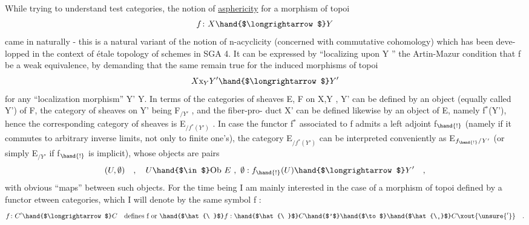 While trying to understand test categories, the notion of \uline{asphericity}
for a morphism of topoi
\[ f\colon X \hand{$\longrightarrow$} Y \]
came in naturally - this is a natural  variant of the notion of
n-acyclicity (concerned with commutative cohomology) which has been deve-%
lopped in the context of étale topology of schemes in SGA 4. It can be
expressed by ``localizing upon Y '' the Artin-Mazur condition that f be
a weak equivalence, by demanding that the same remain true for the induced
morphisms of topoi
\[ X\mathrm{x}_{Y}Y' \hand{$\longrightarrow$} Y' \]
for any ``localization morphism'' Y'\hand{$\longrightarrow$} Y. In terms of the categories of
sheaves  E, F on X,Y , Y' can be defined by an object (equally called
Y') of F, the category of sheaves on Y' being F$_{/Y'}$ , and the fiber-pro-%
duct X' can be defined likewise by an object  of E, namely  f$^{*}$(Y'),
hence the corresponding category of sheaves is E$_{/f^{*}(Y')}$ . In case the
functor f$^{*}$ associated to f admits a left adjoint f$_{\hand{!}}$ (namely if it commutes
to arbitrary inverse limits, not only to finite one's), the category
E$_{/f^{*}(Y')}$ can be interpreted conveniently as  E$_{f_{\hand{!}}/Y'}$ (or simply E$_{/Y'}$
if f$_{\hand{!}}$ is implicit), whose objects are pairs
\[ (U,\emptyset) \quad , \quad U \hand{$\in$} \mathrm{Ob}\ E \ , \ \emptyset : f_{\hand{!}}(U) \hand{$\longrightarrow$} Y' \quad , \]
with obvious ``maps'' between such objects. For the time being I am mainly
interested in the case of a morphism of topoi defined by a functor etween
categories, which I will denote by the same symbol f :
\[ f\colon C' \hand{$\longrightarrow$} C \quad \text{defines f or } \hand{$\hat{\ }$}f : \hand{$\hat{\ }$}C\hand{$'$} \hand{$\to$} \hand{$\hat{\ }$}C\xout{\unsure{'}} \quad . \]
